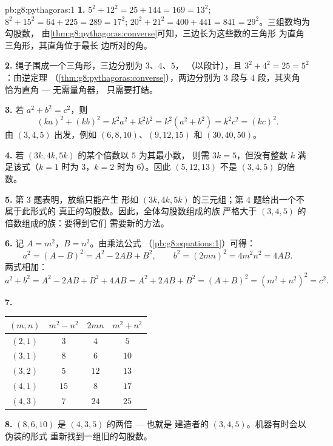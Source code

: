 \begin{solution}{pb:g8:pythagoras:1}
\textbf{1.} $5^2 + 12^2 = 25 + 144 = 169 = 13^2$; \quad
$8^2 + 15^2 = 64 + 225 = 289 = 17^2$; \quad
$20^2 + 21^2 = 400 + 441 = 841 = 29^2$。三组数均为勾股数，
由\cref{thm:g8:pythagoras:converse}可知，三边长为这些数的三角形
为直角三角形，其直角位于最长
边所对的角。

\textbf{2.} 绳子围成一个三角形，三边分别为 $3$、$4$、$5$，
（以段计），且 $3^2 + 4^2 = 25 = 5^2$：由逆定理
（\cref{thm:g8:pythagoras:converse}），两边分别为 $3$ 段与 $4$ 段，其夹角
恰为直角 --- 无需量角器，
只需要打结。

\textbf{3.} 若 $a^2 + b^2 = c^2$，则
\[
(ka)^2 + (kb)^2 = k^2 a^2 + k^2 b^2
= k^2\left(a^2 + b^2\right) = k^2 c^2 = (kc)^2 .
\]
由 $(3, 4, 5)$ 出发，例如 $(6, 8, 10)$、$(9, 12, 15)$ 和
$(30, 40, 50)$。

\textbf{4.} 若 $(3k, 4k, 5k)$ 的某个倍数以 $5$ 为其最小数，
则需 $3k = 5$，但没有整数 $k$
满足该式（$k = 1$ 时为 $3$，$k = 2$ 时为 $6$）。因此
$(5, 12, 13)$ 不是 $(3, 4, 5)$ 的倍数。

\textbf{5.} 第 3 题表明，放缩只能产生
形如 $(3k, 4k, 5k)$ 的三元组；第 4 题给出一个不属于此形式的
真正的勾股数。因此，全体勾股数组成的族
严格大于 $(3, 4, 5)$ 的倍数组成的族：要得到它们
需要新的方法。

\textbf{6.} 记 $A = m^2$，$B = n^2$。由乘法公式
（\cref{pb:g8:equations:1}）可得：
\[
a^2 = (A - B)^2 = A^2 - 2AB + B^2,
\qquad
b^2 = (2mn)^2 = 4m^2n^2 = 4AB .
\]
两式相加：
\[
a^2 + b^2 = A^2 - 2AB + B^2 + 4AB
= A^2 + 2AB + B^2 = (A + B)^2
= \left(m^2 + n^2\right)^2 = c^2 .
\]

\textbf{7.}
\begin{center}
\renewcommand{\arraystretch}{1.2}
\begin{tabular}{c|ccc}
$(m, n)$ & $m^2 - n^2$ & $2mn$ & $m^2 + n^2$ \\
\hline
$(2, 1)$ & $3$ & $4$ & $5$ \\
$(3, 1)$ & $8$ & $6$ & $10$ \\
$(3, 2)$ & $5$ & $12$ & $13$ \\
$(4, 1)$ & $15$ & $8$ & $17$ \\
$(4, 3)$ & $7$ & $24$ & $25$ \\
\end{tabular}
\end{center}

\textbf{8.} $(8, 6, 10)$ 是 $(4, 3, 5)$ 的两倍 --- 也就是
建造者的 $(3, 4, 5)$。机器有时会以伪装的形式
重新找到一组旧的勾股数。


\end{solution}

